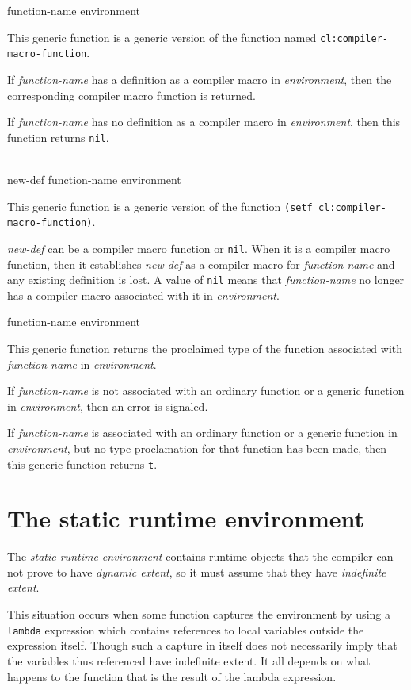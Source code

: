  {function-name environment}

This generic function is a generic version of the \commonlisp{}
function named \texttt{cl:compiler-macro-function}.

If \textit{function-name} has a definition as a compiler macro in
\textit{environment}, then the corresponding compiler macro function
is returned.

If \textit{function-name} has no definition as a compiler macro in
\textit{environment}, then this function returns \texttt{nil}.

\\
{new-def function-name environment}

This generic function is a generic version of the \commonlisp{}
function \texttt{(setf cl:compiler-macro-function)}.

\textit{new-def} can be a compiler macro function or \texttt{nil}.
When it is a compiler macro function, then it establishes
\textit{new-def} as a compiler macro for \textit{function-name} and
any existing definition is lost.  A value of \texttt{nil} means that
\textit{function-name} no longer has a compiler macro associated with
it in \textit{environment}.

 {function-name environment}

This generic function returns the proclaimed type of the function
associated with \textit{function-name} in \textit{environment}.

If \textit{function-name} is not associated with an ordinary function
or a generic function in \textit{environment}, then an error is
signaled.

If \textit{function-name} is associated with an ordinary function or a
generic function in \textit{environment}, but no type proclamation for
that function has been made, then this generic function returns
\texttt{t}.

\section{The static runtime environment}
\label{sec-environments-static-runtime}

The \emph{static runtime environment} contains runtime objects that
the compiler can not prove to have \emph{dynamic extent}, so it must
assume that they have \emph{indefinite extent}.  

This situation occurs when some function captures the environment by
using a \texttt{lambda} expression which contains references to local
variables outside the expression itself.  Though such a capture in
itself does not necessarily imply that the variables thus referenced
have indefinite extent.  It all depends on what happens to the
function that is the result of the lambda expression.  

